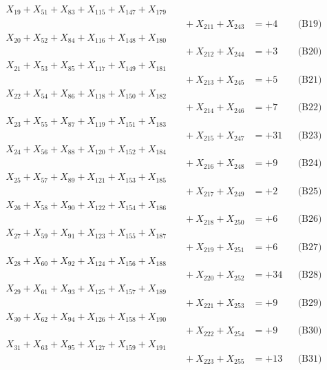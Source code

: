 \documentclass[a4paper,10pt]{article}
\begin{document}
{\begin{align}
X_{19} + X_{51} + X_{83} + X_{115} + X_{147} + X_{179} \\[0.1ex]
&\quad  + X_{211} + X_{243} &= +4 && \text{(B19)} \\
X_{20} + X_{52} + X_{84} + X_{116} + X_{148} + X_{180} \\[0.1ex]
&\quad  + X_{212} + X_{244} &= +3 && \text{(B20)} \\
X_{21} + X_{53} + X_{85} + X_{117} + X_{149} + X_{181} \\[0.1ex]
&\quad  + X_{213} + X_{245} &= +5 && \text{(B21)} \\
\allowbreak
X_{22} + X_{54} + X_{86} + X_{118} + X_{150} + X_{182} \\[0.1ex]
&\quad  + X_{214} + X_{246} &= +7 && \text{(B22)} \\
X_{23} + X_{55} + X_{87} + X_{119} + X_{151} + X_{183} \\[0.1ex]
&\quad  + X_{215} + X_{247} &= +31 && \text{(B23)} \\
X_{24} + X_{56} + X_{88} + X_{120} + X_{152} + X_{184} \\[0.1ex]
&\quad  + X_{216} + X_{248} &= +9 && \text{(B24)} \\
X_{25} + X_{57} + X_{89} + X_{121} + X_{153} + X_{185} \\[0.1ex]
&\quad  + X_{217} + X_{249} &= +2 && \text{(B25)} \\
X_{26} + X_{58} + X_{90} + X_{122} + X_{154} + X_{186} \\[0.1ex]
&\quad  + X_{218} + X_{250} &= +6 && \text{(B26)} \\
\allowbreak
X_{27} + X_{59} + X_{91} + X_{123} + X_{155} + X_{187} \\[0.1ex]
&\quad  + X_{219} + X_{251} &= +6 && \text{(B27)} \\
X_{28} + X_{60} + X_{92} + X_{124} + X_{156} + X_{188} \\[0.1ex]
&\quad  + X_{220} + X_{252} &= +34 && \text{(B28)} \\
X_{29} + X_{61} + X_{93} + X_{125} + X_{157} + X_{189} \\[0.1ex]
&\quad  + X_{221} + X_{253} &= +9 && \text{(B29)} \\
X_{30} + X_{62} + X_{94} + X_{126} + X_{158} + X_{190} \\[0.1ex]
&\quad  + X_{222} + X_{254} &= +9 && \text{(B30)} \\
X_{31} + X_{63} + X_{95} + X_{127} + X_{159} + X_{191} \\[0.1ex]
&\quad  + X_{223} + X_{255} &= +13 && \text{(B31)} \\
\end{align}
}
\end{document}
